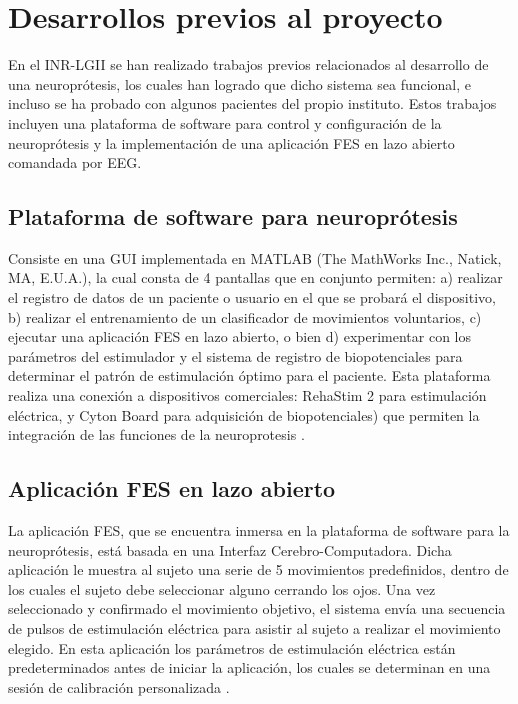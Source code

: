 \section{Desarrollos previos al proyecto}
En el INR-LGII se han realizado trabajos previos relacionados al desarrollo de una neuroprótesis, los cuales han logrado que dicho sistema sea funcional, e incluso se ha probado con algunos pacientes del propio instituto. Estos trabajos incluyen una plataforma de software para control y configuración de la neuroprótesis \cite{Fuentes2018}\cite{JanethFuentes2018} y la implementación de una aplicación FES en lazo abierto comandada por EEG\cite{Castillo2019}\cite{OmarCastillo2019}.

\subsection{Plataforma de software para neuroprótesis}
Consiste en una GUI implementada en MATLAB\textregistered \; (The MathWorks Inc., Natick, MA, E.U.A.), la cual consta de 4 pantallas que en conjunto permiten: a) realizar el registro de datos de un paciente o usuario en el que se probará el dispositivo, b) realizar el entrenamiento de un clasificador de movimientos voluntarios, c) ejecutar una aplicación FES en lazo abierto, o bien d) experimentar con los parámetros del estimulador y el sistema de registro de biopotenciales para determinar el patrón de estimulación óptimo para el paciente. Esta plataforma realiza una conexión a dispositivos comerciales: RehaStim 2 para estimulación eléctrica, y Cyton Board para adquisición de biopotenciales) que permiten la integración de las funciones de la neuroprotesis \cite{Fuentes2018}\cite{JanethFuentes2018}.

\subsection{Aplicación FES en lazo abierto}
La aplicación FES, que se encuentra inmersa en la plataforma de software para la neuroprótesis, está basada en una Interfaz Cerebro-Computadora. Dicha aplicación le muestra al sujeto una serie de 5 movimientos predefinidos, dentro de los cuales el sujeto debe seleccionar alguno cerrando los ojos. Una vez seleccionado y confirmado el movimiento objetivo, el sistema envía una secuencia de pulsos de estimulación eléctrica para asistir al sujeto a realizar el movimiento elegido. En esta aplicación los parámetros de estimulación eléctrica están predeterminados antes de iniciar la aplicación, los cuales se determinan en una sesión de calibración personalizada \cite{Castillo2019}\cite{OmarCastillo2019}.



